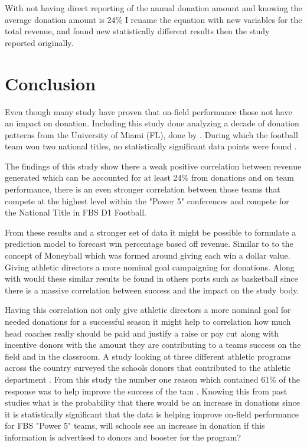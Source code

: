 \documentclass[12pt,english]{article}
\begin{document}
With not having direct reporting of the annual donation amount and knowing the average donation amount is 24\% I rename the equation with new variables for the total revenue, and found new statistically different results then the study reported originally.


\section{Conclusion}\label{sec:conclusion}
Even though many study have proven that on-field performance those not have an impact on donation. Including this study done analyzing a decade of donation patterns from the University of Miami (FL), done by \citet{Cohen}. During which the football team won two national titles, no statistically significant data points were found \citep{Cohen}. 

The findings of this study show there a weak positive correlation between revenue generated which can be accounted for at least 24\% from donations and on team performance, there is an even stronger correlation between those teams that compete at the highest level within the "Power 5" conferences and compete for the National Title in FBS D1 Football. 

From these results and a stronger set of data it might be possible to formulate a prediction model to forecast win percentage based off revenue. Similar to to the concept of Moneyball which was formed around giving each win a dollar value. Giving athletic directors a more nominal goal campaigning for donations. Along with would these similar results be found in others ports such as basketball since there is a massive correlation between success and the impact on the study body. 

Having this correlation not only give athletic directors a more nominal goal for needed donations for a successful season it might help to correlation how much head coaches really should be paid and justify a raise or pay cut along with incentive donors with the amount they are contributing to a teams success on the field and in the classroom. A study looking at three different athletic programs across the country surveyed the schools donors that contributed to the athletic department \citep{Gladden}. From this study the number one reason which contained 61\% of the response was to help improve the success of the tam \citep{Gladden}. Knowing this from past studies what is the probability that there would be an increase in donations since it is statistically significant that the data is helping improve on-field performance for FBS "Power 5" teams, will schools see an increase in donation if this information is advertised to donors and booster for the program? 
\end{document}
